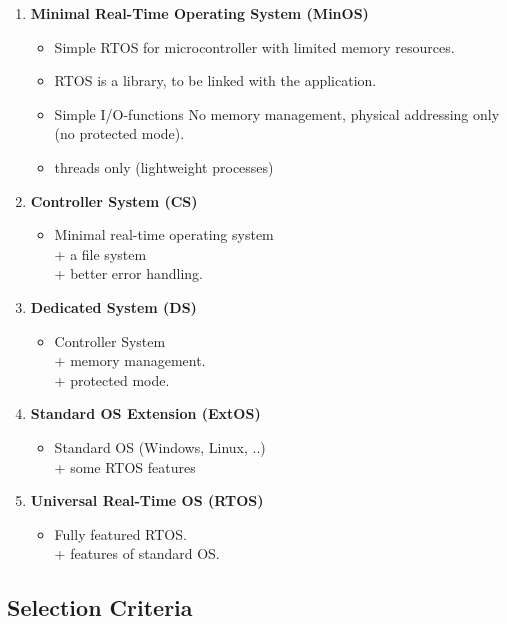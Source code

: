 \begin{enumerate}
\item  \textbf{Minimal Real-Time Operating System (MinOS)} 

\begin{itemize}
	\item Simple RTOS for microcontroller with limited memory resources.
	\item RTOS is a library, to be linked with the application.
	\item Simple I/O-functions No memory management, physical addressing only (no protected mode).
	\item threads only (lightweight processes)
\end{itemize}

\item  \textbf{Controller System (CS)} 

\begin{itemize}
	\item Minimal real-time operating system      \\ + a file system      \\ + better error handling.
\end{itemize}

\item  \textbf{Dedicated System (DS)}   
\begin{itemize}
	\item  Controller System      \\ + memory management.    \\ + protected mode.
\end{itemize}

\item  \textbf{Standard OS Extension (ExtOS)}
\begin{itemize}
	\item  Standard OS (Windows, Linux, ..)  \\ + some RTOS features
\end{itemize} 

\item  \textbf{Universal Real-Time OS (RTOS)} 
\begin{itemize}
	\item  Fully featured RTOS.  \\ + features of standard OS.
\end{itemize} 
\end{enumerate}

\subsection{ Selection Criteria}

